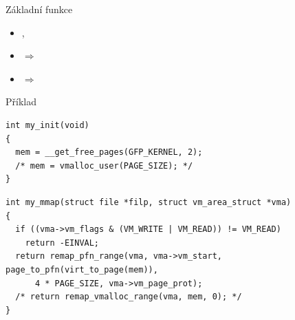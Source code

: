 \begin{frame}[fragile]{Základní  funkce}

  \begin{itemize}
    \item {}, 
    \item {} $\Rightarrow$
    \item {} $\Rightarrow$ 
  \end{itemize}

  \begin{block}{Příklad}
    \begin{lstlisting}[aboveskip=2pt,belowskip=2pt]
int my_init(void)
{
  mem = __get_free_pages(GFP_KERNEL, 2);
  /* mem = vmalloc_user(PAGE_SIZE); */
}
    \end{lstlisting}

    \pause

    \begin{lstlisting}[aboveskip=2pt,belowskip=2pt]
int my_mmap(struct file *filp, struct vm_area_struct *vma)
{
  if ((vma->vm_flags & (VM_WRITE | VM_READ)) != VM_READ)
    return -EINVAL;
  return remap_pfn_range(vma, vma->vm_start, page_to_pfn(virt_to_page(mem)),
      4 * PAGE_SIZE, vma->vm_page_prot);
  /* return remap_vmalloc_range(vma, mem, 0); */
}
    \end{lstlisting}
  \end{block}

\end{frame}

